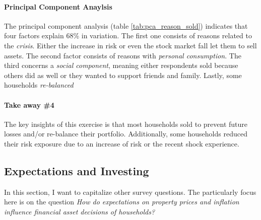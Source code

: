 \documentclass[ProjectABM]{subfiles}
\begin{document}
\paragraph{Principal Component Anaylsis}
The principal component analysis (table \ref{tab:pca_reason_sold}) indicates that four factors explain 68\% in variation. The first one consists of reasons related to the \textit{crisis}. Either the increase in risk or even the stock market fall let them to sell assets. The second factor consists of reasons with \textit{personal consumption}. The third concerns a \textit{social component}, meaning either respondents sold because others did as well or they wanted to support friends and family. Lastly, some households \textit{re-balanced}



\paragraph{Take away \#4}
The key insights of this exercise is that most households sold to prevent future losses and/or re-balance their portfolio. Additionally, some households reduced their risk exposure due to an increase of risk or the recent shock experience.

\subsection{Expectations and Investing} \label{sec:results_exp}
In this section, I want to capitalize other survey questions. The particularly focus here is on the question \textit{How do expectations on property prices and inflation influence financial asset decisions of households?} %

\end{document}
